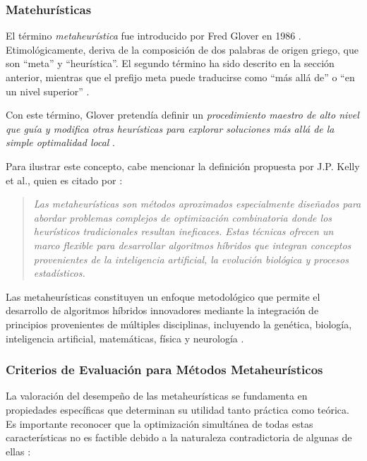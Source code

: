 \documentclass[12pt,titlepage,twoside,openright]{book}
\begin{document}
\subsubsection{Matehurísticas}

El término \textit{metaheurística} fue introducido por Fred Glover en 1986 \citep{antonioSuarez2014}. Etimológicamente, deriva de la composición de dos palabras de origen griego, que son “meta” y “heurística”. El segundo término ha sido descrito en la sección anterior, mientras que el prefijo meta puede traducirse como “más allá de” o “en un nivel superior” \citep{duarte2007metaheuristicas}.

Con este término, Glover pretendía definir un \textit{procedimiento maestro de alto nivel que guía y modifica otras heurísticas para explorar soluciones más allá de la simple optimalidad local} \citep{duarte2007metaheuristicas}.

Para ilustrar este concepto, cabe mencionar la definición propuesta por J.P. Kelly et al., quien es citado por \citep{duarte2007metaheuristicas}:

\begin{quote}
	\textit{Las metaheurísticas son métodos aproximados especialmente diseñados para abordar problemas complejos de optimización combinatoria donde los heurísticos tradicionales resultan ineficaces. Estas técnicas ofrecen un marco flexible para desarrollar algoritmos híbridos que integran conceptos provenientes de la inteligencia artificial, la evolución biológica y procesos estadísticos.}
\end{quote}

Las metaheurísticas constituyen un enfoque metodológico que permite el desarrollo de algoritmos híbridos innovadores mediante la integración de principios provenientes de múltiples disciplinas, incluyendo la genética, biología, inteligencia artificial, matemáticas, física y neurología \citep{antonioSuarez2014}.

\subsubsection*{Criterios de Evaluación para Métodos Metaheurísticos}

La valoración del desempeño de las metaheurísticas se fundamenta en propiedades específicas que determinan su utilidad tanto práctica como teórica. Es importante reconocer que la optimización simultánea de todas estas características no es factible debido a la naturaleza contradictoria de algunas de ellas \citep{antonioSuarez2014}:
\end{document}
